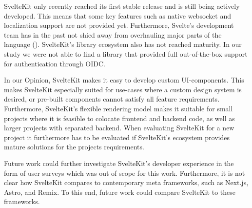 SvelteKit only recently reached its first stable release and is still being actively developed. This means that some key features such as native websocket and localization support are not provided yet. Furthermore, Svelte's development team has in the past not shied away from overhauling major parts of the language (). SvelteKit's library ecosystem also has not reached maturity. In our study we were not able to find a library that provided full out-of-the-box support for authentication through OIDC.

In our Opinion, SvelteKit makes it easy to develop custom UI-components. This makes SvelteKit especially suited for use-cases where a custom design system is desired, or pre-built components cannot satisfy all feature requirements. Furthermore, SvelteKit's flexible rendering model makes it suitable for small projects where it is feasible to colocate frontend and backend code, as well as larger projects with separated backend. When evaluating SvelteKit for a new project it furthermore has to be evaluated if SvelteKit's ecosystem provides mature solutions for the projects requirements.


Future work could further investigate SvelteKit's developer experience in the form of user surveys which was out of scope for this work. Furthermore, it is not clear how SvelteKit compares to contemporary meta frameworks, such as Next.js, Astro, and Remix. To this end, future work could compare SvelteKit to these frameworks. 

